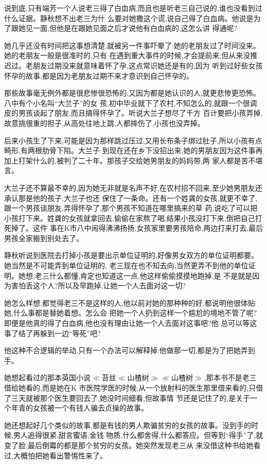 ﻿\documentclass[12pt]{article}
\begin{document}
说到底,只有端芳一个人说老三得了白血病,而且也是听老三自己说的,谁也没看到过什么证据。静秋想不出老三为什
么要对她撒这个谎,说自己得了白血病。他说是为了跟她见一面,但他是在跟她见面之后才说他有白血病的,这怎么讲
得通呢?

她几乎还没有时间把这事想清楚,就被另一件事吓晕了:她的老朋友过了时间没来。她的老朋友一般是很准时的,只有
在遇到重大事件的时候,才会提前来,但从来没推迟过。老朋友过期没来就意味着怀了孕,这点常识她还是有的,因为
听到过好些女孩怀孕的故事,都是因为老朋友过期不来才意识到自己怀孕的。

那些故事毫无例外都是很悲惨很恐怖的,又因为都是她认识的人,就更悲惨更恐怖。八中有个小名叫``大兰子''的女
孩,初中毕业就下了农村,不知怎么的,就跟一个很调皮的男孩谈起了朋友,而且搞得怀孕了。听说大兰子想尽了千方
百计要把小孩弄掉,故意挑很重的担子,从高处往地上跳,人都摔伤了,小孩也没弄掉。

后来小孩生了下来,可能是因为那样跳过压过,又用长布条子绑过肚子,所以小孩有点畸形,有两根肋骨下陷。大兰子
到现在还在乡下没招出来,她的男朋友因为这件事再加上打架什么的,被判了二十年。那孩子交给她男朋友的妈妈带,两
家人都是苦不堪言。

大兰子还不算最不幸的,因为她无非就是名声不好,在农村招不回来,至少她男朋友还承认那是他的孩子,大兰子也还
保住了一条命。还有一个姓龚的女孩,就更不幸了,跟一个男孩谈朋友,弄得怀孕了,那个男孩不知道在哪里搞来的草
药,说吃了可以把小孩打下来。姓龚的女孩就拿回去,偷偷在家熬了喝,结果小孩没打下来,倒把自己打死掉了。这件
事在K市八中闹得沸沸扬扬,女孩家里要男孩陪命,两边打来打去,最后男孩全家搬到别处去了。

静秋听说到医院去打掉小孩是要出示单位证明的,好像男女双方的单位证明都要。她当然是不可能弄到单位证明的,
老三现在也不知去向,当然更弄不到他的单位证明。她想,老三什么都懂,肯定也知道这一点,他这样偷偷摸摸地跑掉,是
不是就是因为害怕丢这个人?所以及早跑掉,让她一个人去面对这一切?

她怎么样想,都觉得老三不是这样的人,他以前对她的那种种的好,都说明他很体贴她,什么事都是替她着想。怎么会
把她一个人扔到这样一个尴尬的境地不管了呢?即便是他真的得了白血病,他也没有理由让她一个人去面对这事吧?他
总可以等这事了结了再躲到一边``等死''吧?

他这种不合逻辑的举动,只有一个办法可以解释掉:他做那一切,都是为了把她弄到手。

她想起看过的那本英国小说$\ll$苔丝$\ll$山楂树$\gg$$\ll$山楂树$\gg$,那本书不是老三借给她看的,而是她在K
市医院学医的时候,从一个放射科的医生那里借来看的,只借了三天就被那个医生要回去了,她没时间细看,但故事情
节还是记住了的,是关于一个年青的女孩被一个有钱人骗去贞操的故事。

她还想起好几个类似的故事,都是有钱的男人欺骗贫穷的女孩的故事。没到手的时候,男人追得很紧,甜言蜜语,金钱
物质,什么都舍得,什么都答应。但等到``得手''了,就变了脸,最后倒霉的都是那个贫穷的女孩。她突然发现老三从
来没借这种书给她看过,大概怕把她看出警惕性来了。
\end{document}
